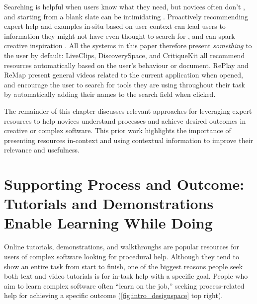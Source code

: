 Searching is helpful when users know what they need, but novices often don't \cite{Miyake1979}, and starting from a blank slate can be intimidating \cite{Kelley2013}. Proactively recommending expert help and examples in-situ based on user context can lead users to information they might not have even thought to search for \cite{Matejka2009, Chilana2012, Matejka2011, Ichinco2017}, and can spark creative inspiration \cite{Bawden1986, Kulkarni2014, Herring2009}. All the systems in this paper therefore present \textit{something} to the user by default: LiveClips, DiscoverySpace, and CritiqueKit all recommend resources automatically based on the user's behaviour or document. RePlay and ReMap present general videos related to the current application when opened, and encourage the user to search for tools they are using throughout their task by automatically adding their names to the search field when clicked. 

The remainder of this chapter discusses relevant approaches for leveraging expert resources to help novices understand processes and achieve desired outcomes in creative or complex software. This prior work highlights the importance of presenting resources in-context and using contextual information to improve their relevance and usefulness. 

\section{Supporting Process and Outcome: Tutorials and Demonstrations Enable Learning While Doing}
Online tutorials, demonstrations, and walkthroughs are popular resources for users of complex software looking for procedural help. Although they tend to show an entire task from start to finish, one of the biggest reasons people seek both text \cite{Lafreniere2013a} and video \cite{AlamAnik2015} tutorials is for in-task help with a specific goal. People who aim to learn complex software often ``learn on the job,'' seeking process-related help for achieving a specific outcome (\autoref{fig:intro_designspace} top right).

